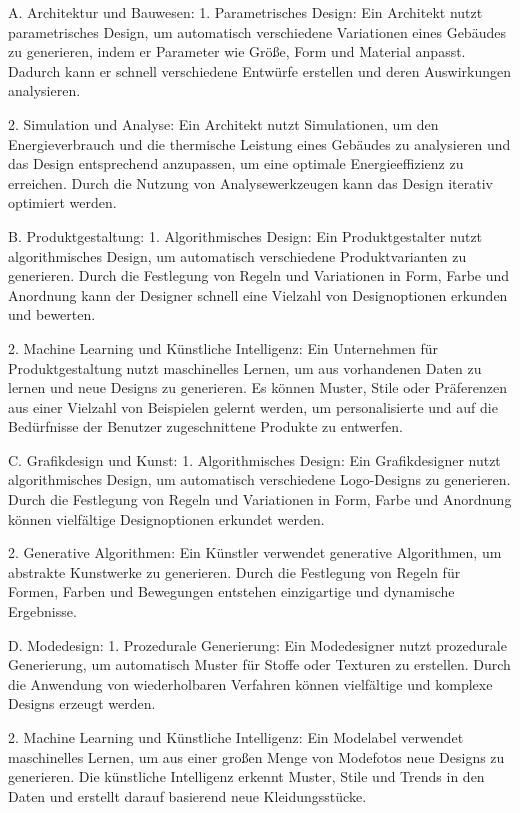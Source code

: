 A. Architektur und Bauwesen:
1. Parametrisches Design: Ein Architekt nutzt parametrisches Design, um automatisch verschiedene Variationen eines Gebäudes zu generieren, indem er Parameter wie Größe, Form und Material anpasst. Dadurch kann er schnell verschiedene Entwürfe erstellen und deren Auswirkungen analysieren.

2. Simulation und Analyse: Ein Architekt nutzt Simulationen, um den Energieverbrauch und die thermische Leistung eines Gebäudes zu analysieren und das Design entsprechend anzupassen, um eine optimale Energieeffizienz zu erreichen. Durch die Nutzung von Analysewerkzeugen kann das Design iterativ optimiert werden.

B. Produktgestaltung:
1. Algorithmisches Design: Ein Produktgestalter nutzt algorithmisches Design, um automatisch verschiedene Produktvarianten zu generieren. Durch die Festlegung von Regeln und Variationen in Form, Farbe und Anordnung kann der Designer schnell eine Vielzahl von Designoptionen erkunden und bewerten.

2. Machine Learning und Künstliche Intelligenz: Ein Unternehmen für Produktgestaltung nutzt maschinelles Lernen, um aus vorhandenen Daten zu lernen und neue Designs zu generieren. Es können Muster, Stile oder Präferenzen aus einer Vielzahl von Beispielen gelernt werden, um personalisierte und auf die Bedürfnisse der Benutzer zugeschnittene Produkte zu entwerfen.

C. Grafikdesign und Kunst:
1. Algorithmisches Design: Ein Grafikdesigner nutzt algorithmisches Design, um automatisch verschiedene Logo-Designs zu generieren. Durch die Festlegung von Regeln und Variationen in Form, Farbe und Anordnung können vielfältige Designoptionen erkundet werden.

2. Generative Algorithmen: Ein Künstler verwendet generative Algorithmen, um abstrakte Kunstwerke zu generieren. Durch die Festlegung von Regeln für Formen, Farben und Bewegungen entstehen einzigartige und dynamische Ergebnisse.

D. Modedesign:
1. Prozedurale Generierung: Ein Modedesigner nutzt prozedurale Generierung, um automatisch Muster für Stoffe oder Texturen zu erstellen. Durch die Anwendung von wiederholbaren Verfahren können vielfältige und komplexe Designs erzeugt werden.

2. Machine Learning und Künstliche Intelligenz: Ein Modelabel verwendet maschinelles Lernen, um aus einer großen Menge von Modefotos neue Designs zu generieren. Die künstliche Intelligenz erkennt Muster, Stile und Trends in den Daten und erstellt darauf basierend neue Kleidungsstücke.

